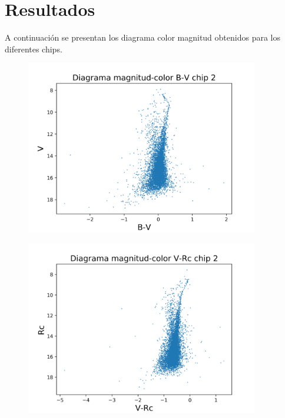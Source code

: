 \documentclass[12pt]{article}
\begin{document}
\section{Resultados}
A continuación se presentan los diagrama color magnitud obtenidos para los diferentes chips. 
\begin{figure}[H]
  \centering
   \includegraphics[width = 4in]{B-V2.png}
\end{figure}
\begin{figure}[H]
  \centering
   \includegraphics[width = 4in]{V-Rc2.png}
\end{figure}
\end{document}
